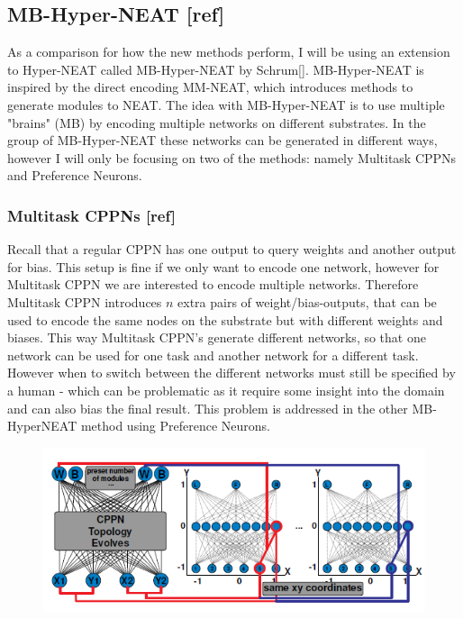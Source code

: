 \documentclass[11pt, a4paper]{article}
\begin{document}
\subsection{MB-Hyper-NEAT [ref]}
As a comparison for how the new methods perform, I will be  using an extension to Hyper-NEAT called MB-Hyper-NEAT by Schrum[]. MB-Hyper-NEAT is inspired by the direct encoding MM-NEAT, which introduces methods to generate modules to NEAT. The idea with MB-Hyper-NEAT is to use multiple "brains" (MB) by encoding multiple networks on different substrates. In the group of MB-Hyper-NEAT these networks can be generated in different ways, however I will only be focusing on two of the methods: namely Multitask CPPNs and Preference Neurons.
\subsubsection{Multitask CPPNs [ref]}
Recall that a regular CPPN has one output to query weights and another output for bias. This setup is fine if we only want to encode one network, however for Multitask CPPN we are interested to encode multiple networks. Therefore Multitask CPPN introduces $ n $ extra pairs of weight/bias-outputs, that can be used to encode the same nodes on the substrate but with different weights and biases. This way Multitask CPPN's generate different networks, so that one network can be used for one task and another network for a different task. However when to switch between the different networks must still be specified by a human - which can be problematic as it require some insight into the domain and can also bias the final result. This problem is addressed in the other MB-HyperNEAT method using Preference Neurons.
\begin{figure}[!ht]
\centering
\includegraphics[scale=0.6]{MultitaskCPPN}
\caption{}
\end{figure}
\end{document}
